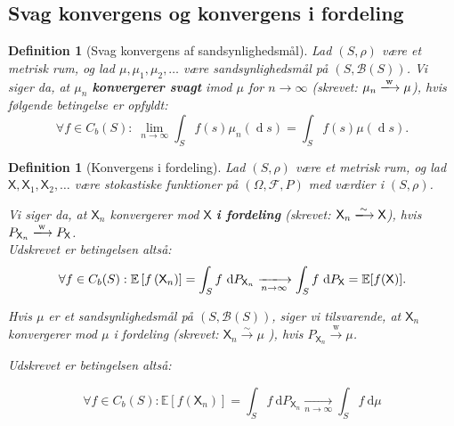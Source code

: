 \documentclass{article}
\newcommand{\1}{\mathbbm{1}}
\newcommand{\X}{\mathsf{X}}
\newcommand{\deriv}{\operatorname{d}}
\newcommand{\pfield}{(\Omega, \mathcal{F}, P)}
\theoremstyle{boxed}
\newtheorem{definition}[theorem]{Definition}
\begin{document}
\subsection{Svag konvergens og konvergens i fordeling}
\begin{theorem-box}
    \begin{definition}[Svag konvergens af sandsynlighedsmål]
        Lad $(S,\rho)$ være et metrisk rum, og lad $\mu,\mu_1,\mu_2,\ldots$ være sandsynlighedsmål på $(S,\mathcal{B}(S))$. Vi siger da, at $\mu_n$ \textbf{konvergerer svagt} imod $\mu$ for $n\rightarrow \infty$ (skrevet: $\mu_n \xlongrightarrow{\mathrm{w}}\mu$), hvis følgende betingelse er opfyldt:
        $$\forall f\in C_b(S):\;\lim_{n\rightarrow \infty}\int_Sf(s)\mu_n(\deriv s)=\int_Sf(s)\mu(\deriv s).$$
    \end{definition}
\end{theorem-box}
\begin{theorem-box}
    \begin{definition}[Konvergens i fordeling]
        Lad $(S,\rho)$ være et metrisk rum, og lad $\X,\X_1,\X_2,\ldots$ være stokastiske funktioner på $\pfield$ med værdier i $(S,\rho)$.

        Vi siger da, at $\X_n$ konvergerer mod $\X$ \textbf{i fordeling} (skrevet: $\X_n\xlongrightarrow{\sim}\X$), hvis $P_{\X_n}\xlongrightarrow{\mathrm{w}}P_\X$.\\Udskrevet er betingelsen altså:
        $$
        \forall f \in C_b(S): \mathbb{E}\left[f\left(\mathsf{X}_n\right)\right]=\int_S f \mathrm{~d} P_{\mathsf{X}_n} \xlongrightarrow[n \rightarrow \infty]{ } \int_S f \mathrm{~d} P_{\mathsf{X}}=\mathbb{E}[f(\mathsf{X})] .
        $$
        
        
        Hvis $\mu$ er et sandsynlighedsmål på $(S, \mathcal{B}(S))$, siger vi tilsvarende, at $\X_n$ konvergerer mod $\mu$ i fordeling (skrevet: $\mathsf{X}_n \xrightarrow{\sim} \mu$ ), hvis $P_{\mathsf{X}_n} \xrightarrow{\mathrm{ w }} \mu$.
        
        Udskrevet er betingelsen altså:
        
        $$
        \forall f \in C_b(S): \mathbb{E}\left[f\left(\mathsf{X}_n\right)\right]=\int_S f \mathrm{~d} P_{\mathsf{X}_n} \xrightarrow[n \rightarrow \infty]{ } \int_S f \mathrm{~d} \mu
        $$
        
    \end{definition}
\end{theorem-box}
\end{document}
